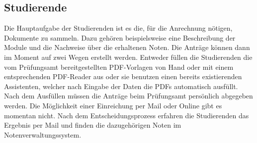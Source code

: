 \subsection{Studierende}

Die Hauptaufgabe der Studierenden ist es die, für die Anrechnung nötigen, Dokumente zu sammeln. Dazu gehören beispielsweise eine Beschreibung der Module und die Nachweise über die erhaltenen Noten. Die Anträge können dann im Moment auf zwei Wegen erstellt werden. Entweder füllen die Studierenden die vom Prüfungsamt bereitgestellten PDF-Vorlagen von Hand oder mit einem entsprechenden PDF-Reader aus oder sie benutzen einen bereits existierenden Assistenten, welcher nach Eingabe der Daten die PDFs automatisch ausfüllt. Nach dem Ausfüllen müssen die Anträge beim Prüfungsamt persönlich abgegeben werden. Die Möglichkeit einer Einreichung per Mail oder Online gibt es momentan nicht. Nach dem Entscheidungsprozess erfahren die Studierenden das Ergebnis per Mail und finden die dazugehörigen Noten im Notenverwaltungssystem.
